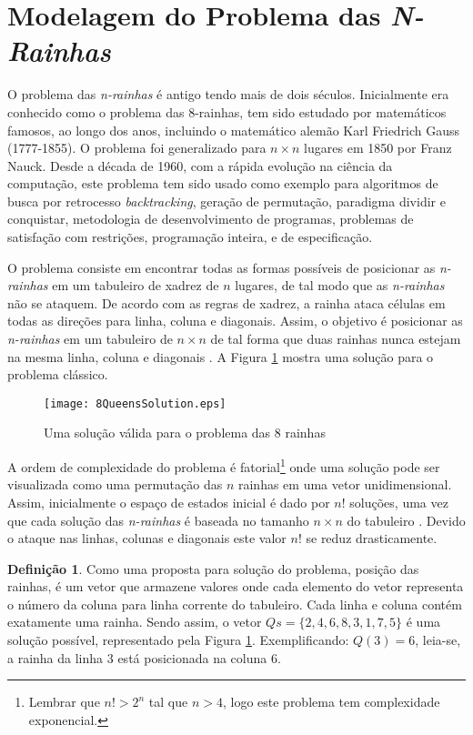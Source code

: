 \documentclass[12pt]{article}
\newcommand{\nrainhas}{\emph{n-rainhas }}
\newcommand{\Nrainhas}{\emph{N-Rainhas }}
\theoremstyle{definition}
\newtheorem{defn}{Definição}[section]
\begin{document}
\section{Modelagem do Problema das \Nrainhas}
\label{sec_modelagem}

O problema das \nrainhas é antigo tendo mais de dois séculos. Inicialmente era conhecido como o problema das 8-rainhas, tem sido estudado por  matemáticos famosos, ao longo dos anos, incluindo o  matemático alemão Karl Friedrich Gauss (1777-1855). O problema foi generalizado para $n \times n$ lugares em 1850 por Franz Nauck. Desde a década de 1960, com a rápida evolução na ciência da computação, este problema tem sido usado como exemplo para algoritmos de busca por retrocesso \emph{backtracking}, geração de permutação, paradigma dividir e conquistar, metodologia de desenvolvimento de programas, problemas de satisfação com restrições, programação inteira, e de especificação.


O problema consiste em encontrar todas as formas possíveis 
de posicionar as \nrainhas em um tabuleiro de xadrez de $n$ 
lugares, de tal modo que as \nrainhas não se ataquem. 
De acordo com as regras de xadrez, a rainha ataca 
células em todas as direções para linha, coluna e diagonais. 
Assim, o objetivo é posicionar as \nrainhas em um tabuleiro 
de $n \times n$ de tal forma que duas rainhas nunca estejam
 na mesma linha, coluna e diagonais \cite{Tsang93}. 
 A Figura \ref{fig:8QueensSolution} mostra uma solução 
 para o problema clássico.

\begin{figure}[ht]
\centering
\texttt{[image: 8QueensSolution.eps]}
\caption{Uma solução válida para o problema das 8 rainhas}
\label{fig:8QueensSolution}
\end{figure}

A ordem de complexidade do problema é fatorial\footnote{Lembrar que $n! > 2^n$ tal que $n>4$, logo este problema tem complexidade exponencial.} onde uma solução pode ser visualizada como uma permutação das $n$ rainhas em uma vetor unidimensional. Assim, inicialmente o espaço de estados inicial é dado por $n!$ soluções, uma vez que cada solução das \nrainhas é 
baseada no tamanho $n \times n$ do tabuleiro \cite{Tsang93}. 
Devido o ataque nas linhas, colunas e diagonais este valor $n!$ se reduz drasticamente.

\begin{defn}
\label{def:constrains1}
Como uma proposta para solução do problema, posição das rainhas, é um vetor que armazene 
valores onde cada elemento do vetor representa o número da coluna para  linha corrente do tabuleiro. 
Cada linha e coluna contém exatamente uma rainha. Sendo assim, o 
vetor $Qs = \{2, 4, 6, 8, 3, 1, 7, 5\}$ é uma solução possível, 
representado pela Figura \ref{fig:8QueensSolution}. Exemplificando: $Q(3)=6$, leia-se, a rainha da linha $3$
está posicionada na coluna $6$.
\end{defn}
\end{document}
